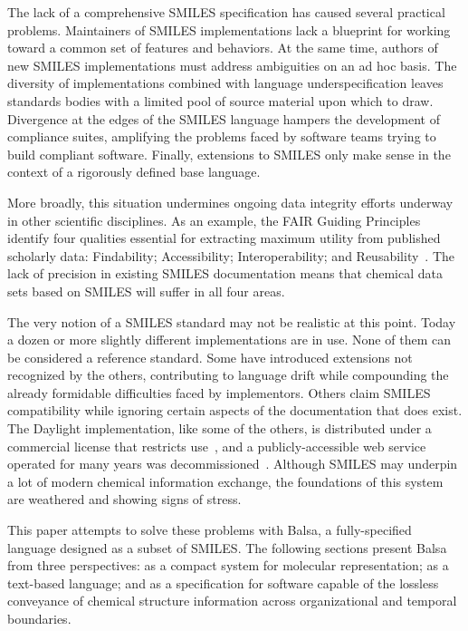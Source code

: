 \documentclass{article}
\begin{document}
The lack of a comprehensive SMILES specification has caused several practical problems. Maintainers of SMILES implementations lack a blueprint for working toward a common set of features and behaviors. At the same time, authors of new SMILES implementations must address ambiguities on an ad hoc basis. The diversity of implementations combined with language underspecification leaves standards bodies with a limited pool of source material upon which to draw. 
Divergence at the edges of the SMILES language hampers the development of compliance suites, amplifying the problems faced by software teams trying to build compliant software. Finally, extensions to SMILES only make sense in the context of a rigorously defined base language.

More broadly, this situation undermines ongoing data integrity efforts underway in other scientific disciplines. As an example, the FAIR Guiding Principles identify four qualities essential for extracting maximum utility from published scholarly data: Findability; Accessibility; Interoperability; and Reusability~\cite{wilkinson:2016}. The lack of precision in existing SMILES documentation means that chemical data sets based on SMILES will suffer in all four areas.

The very notion of a SMILES standard may not be realistic at this point. Today a dozen or more slightly different implementations are in use. None of them can be considered a reference standard. Some have introduced extensions not recognized by the others, contributing to language drift while compounding the already formidable difficulties faced by implementors. Others claim SMILES compatibility while ignoring certain aspects of the documentation that does exist. The Daylight implementation, like some of the others, is distributed under a commercial license that restricts use~\cite{daylightToolkit}, and a publicly-accessible web service operated for many years was decommissioned~\cite{depictArchive}. Although SMILES may underpin a lot of modern chemical information exchange, the foundations of this system are weathered and showing signs of stress.

This paper attempts to solve these problems with Balsa, a fully-specified language designed as a subset of SMILES. The following sections present Balsa from three perspectives: as a compact system for molecular representation; as a text-based language; and as a specification for software capable of the lossless conveyance of chemical structure information across organizational and temporal boundaries.
\end{document}
